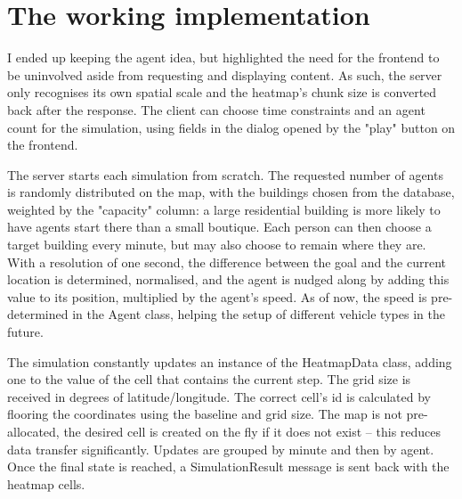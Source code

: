 \label{simulation-working}
\section{The working implementation}

I ended up keeping the agent idea, but highlighted the need for the frontend to be uninvolved aside from requesting and displaying content. As such, the server only recognises its own spatial scale and the heatmap's chunk size is converted back after the response. The client can choose time constraints and an agent count for the simulation, using fields in the dialog opened by the "play" button on the frontend.

The server starts each simulation from scratch. The requested number of agents is randomly distributed on the map, with the buildings chosen from the database, weighted by the "capacity" column: a large residential building is more likely to have agents start there than a small boutique. Each person can then choose a target building every minute, but may also choose to remain where they are. With a resolution of one second, the difference between the goal and the current location is determined, normalised, and the agent is nudged along by adding this value to its position, multiplied by the agent's speed. As of now, the speed is pre-determined in the Agent class, helping the setup of different vehicle types in the future.

The simulation constantly updates an instance of the HeatmapData class, adding one to the value of the cell that contains the current step. The grid size is received in degrees of latitude/longitude. The correct cell's id is calculated by flooring the coordinates using the baseline and grid size. The map is not pre-allocated, the desired cell is created on the fly if it does not exist -- this reduces data transfer significantly. Updates are grouped by minute and then by agent. Once the final state is reached, a SimulationResult message is sent back with the heatmap cells.

